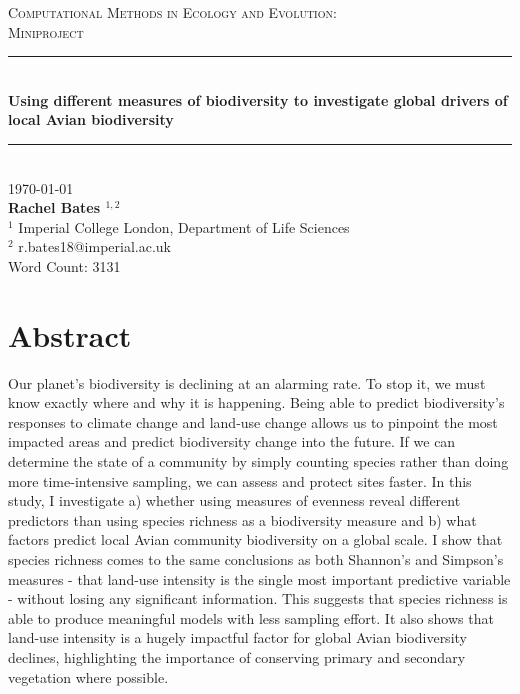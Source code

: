 \documentclass[11pt]{article}
\newcommand{\HRule}[1]{\rule{\linewidth}{#1}} 	%
\begin{document}
\begin{titlepage}
\vspace*{0.05\textheight}
\centering
    \normalsize \textsc{\large Computational Methods in Ecology and Evolution:\\[0.4cm] Miniproject} 	%
    \\[1.0cm]								%
	\HRule{0.5pt} \\ [0.5cm]					%
	\LARGE \textbf{Using different measures of biodiversity to investigate global drivers of local Avian biodiversity} \\[0.2cm]	%
	\HRule{0.5pt}     %
	\\ [1.0cm]		 %
	\normalsize \today
	\\[2.0cm]
    \textbf{\Large{Rachel Bates $^{1,2}$}}
    \\[0.5cm]
    \normalsize $^1$ Imperial College London, Department of Life Sciences
    \\ $^2$ r.bates18@imperial.ac.uk
    \\\vfill
    Word Count: 3131
    \vspace*{0.02\textheight}
\end{titlepage}
\newpage
\linenumbers  %

\section*{Abstract}

Our planet's biodiversity is declining at an alarming rate. To stop it, we must know exactly where and why it is happening. Being able to predict biodiversity's responses to climate change and land-use change allows us to pinpoint the most impacted areas and predict biodiversity change into the future. If we can determine the state of a community by simply counting species rather than doing more time-intensive sampling, we can assess and protect sites faster.
In this study, I investigate a) whether using measures of evenness reveal different predictors than using species richness as a biodiversity measure and b) what factors predict local Avian community biodiversity on a global scale. I show that species richness comes to the same conclusions as both Shannon's and Simpson's measures - that land-use intensity is the single most important predictive variable - without losing any significant information. This suggests that species richness is able to produce meaningful models with less sampling effort. It also shows that land-use intensity is a hugely impactful factor for global Avian biodiversity declines, highlighting the importance of conserving primary and secondary vegetation where possible.
\end{document}

